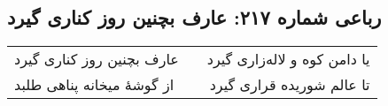 \begin{center}
\section*{رباعی شماره ۲۱۷: عارف بچنین روز کناری گیرد}
\label{sec:sh217}
\begin{longtable}{l p{0.5cm} r}
عارف بچنین روز کناری گیرد
&&
یا دامن کوه و لاله‌زاری گیرد
\\
از گوشهٔ میخانه پناهی طلبد
&&
تا عالم شوریده قراری گیرد
\\
\end{longtable}
\end{center}
